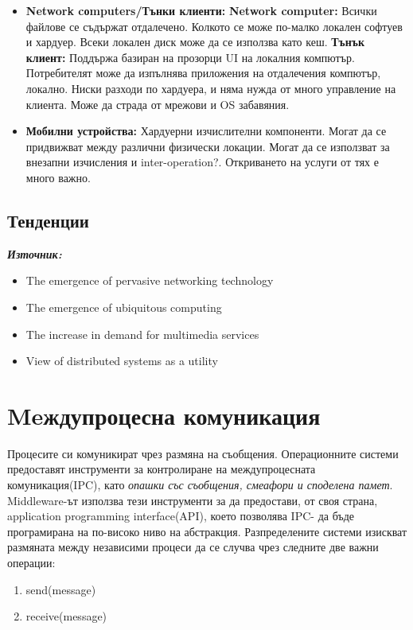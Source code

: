 \documentclass[11pt]{article} %
\newcommand{\italicBold}[1]{\textbf{\emph{#1}}}
\newcommand{\source}{\italicBold{Източник: }}
\begin{document}
\begin{itemize}[noitemsep]
	\item \textbf{Network cоmputers/Тънки клиенти: } \textbf{Network computer: }Всички файлове се съдържат отдалечено. Колкото се може по-малко локален софтуев и хардуер. Всеки локален диск може да се използва като кеш. \textbf{Тънък клиент: } Поддържа базиран на прозорци UI на локалния компютър. Потребителят може да изпълнява приложения на отдалечения компютър, локално. Ниски разходи по хардуера, и няма нужда от много управление на клиента. Може да страда от мрежови и OS забавяния.
	\item \textbf{Мобилни устройства: } Хардуерни изчислителни компоненти. Могат да се придвижват между различни физически локации. Могат да се използват за внезапни изчисления и inter-operation?. Откриването на услуги от тях е много важно. \\\par
\end{itemize}

\subsection{Тенденции}
\source {}
\begin{itemize}[noitemsep]
	\item The emergence of pervasive networking technology
	\item The emergence of ubiquitous computing
	\item The increase in demand for multimedia services
	\item View of distributed systems as a utility
\end{itemize}

\section{Meждупроцесна комуникация}
Процесите си комуникират чрез размяна на съобщения. Операционните системи предоставят инструменти за контролиране на междупроцесната комуникация(IPC), като \textit{опашки със съобщения, смеафори и споделена памет}. Middleware-ът използва тези инструменти за да предостави, от своя страна, application programming interface(API), което позволява IPC- да бъде програмирана на по-високо ниво на абстракция. Разпределените системи изискват размяната между независими процеси да се случва чрез следните две важни операции: 
\begin{enumerate}[noitemsep]
	\item send(message)
	\item receive(message)\\\par
\end{enumerate} 
\end{document}
